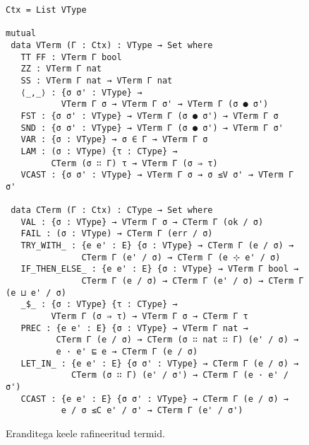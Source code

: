 \documentclass[a4paper,12pt]{article}
\begin{document}
\begin{figure}
  \begin{BVerbatim}
Ctx = List VType

mutual
 data VTerm (Γ : Ctx) : VType → Set where
   TT FF : VTerm Γ bool
   ZZ : VTerm Γ nat
   SS : VTerm Γ nat → VTerm Γ nat
   ⟨_,_⟩ : {σ σ' : VType} →
           VTerm Γ σ → VTerm Γ σ' → VTerm Γ (σ ● σ')
   FST : {σ σ' : VType} → VTerm Γ (σ ● σ') → VTerm Γ σ
   SND : {σ σ' : VType} → VTerm Γ (σ ● σ') → VTerm Γ σ'
   VAR : {σ : VType} → σ ∈ Γ → VTerm Γ σ
   LAM : (σ : VType) {τ : CType} →
         CTerm (σ ∷ Γ) τ → VTerm Γ (σ ⇒ τ)
   VCAST : {σ σ' : VType} → VTerm Γ σ → σ ≤V σ' → VTerm Γ σ'

 data CTerm (Γ : Ctx) : CType → Set where
   VAL : {σ : VType} → VTerm Γ σ → CTerm Γ (ok / σ)
   FAIL : (σ : VType) → CTerm Γ (err / σ)
   TRY_WITH_ : {e e' : E} {σ : VType} → CTerm Γ (e / σ) →
               CTerm Γ (e' / σ) → CTerm Γ (e ⊹ e' / σ)
   IF_THEN_ELSE_ : {e e' : E} {σ : VType} → VTerm Γ bool →
               CTerm Γ (e / σ) → CTerm Γ (e' / σ) → CTerm Γ (e ⊔ e' / σ)
   _$_ : {σ : VType} {τ : CType} →
         VTerm Γ (σ ⇒ τ) → VTerm Γ σ → CTerm Γ τ
   PREC : {e e' : E} {σ : VType} → VTerm Γ nat →
          CTerm Γ (e / σ) → CTerm (σ ∷ nat ∷ Γ) (e' / σ) →
          e · e' ⊑ e → CTerm Γ (e / σ)
   LET_IN_ : {e e' : E} {σ σ' : VType} → CTerm Γ (e / σ) →
             CTerm (σ ∷ Γ) (e' / σ') → CTerm Γ (e · e' / σ')
   CCAST : {e e' : E} {σ σ' : VType} → CTerm Γ (e / σ) →
           e / σ ≤C e' / σ' → CTerm Γ (e' / σ')
  \end{BVerbatim}
  \caption{Eranditega keele rafineeritud termid.}
  \label{fig:exc.refined}
\end{figure}
\end{document}
